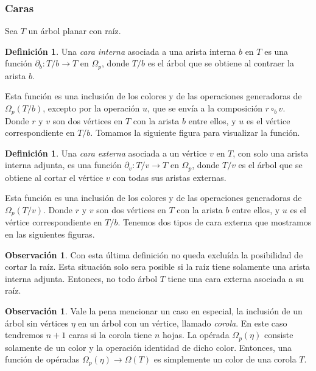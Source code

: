 \documentclass[11pt,a4paper,openright,oneside]{article}
\numberwithin{equation}{section}
\theoremstyle{definition}
\newtheorem{defi}[teo]{Definici\'on}
\newtheorem{obs}[teo]{Observaci\'on}
\begin{document}
\subsubsection{Caras}
Sea $T$ un \'arbol planar con ra\'iz.
\begin{defi}
    Una \emph{cara interna} asociada a una arista interna $b$ en $T$ es una funci\'on $\partial_b \colon T/b\to T$ en $\Omega_p$, donde $T/b$ es el \'arbol que se obtiene al contraer la arista $b$.

    Esta funci\'on es una inclusi\'on de los colores y de las operaciones generadoras de $\Omega_p(T/b)$, excepto por la operaci\'on $u$, que se env\'ia a la composici\'on $r\circ_b v$.
    Donde $r$ y $v$ son dos v\'ertices en $T$ con la arista $b$ entre ellos, y $u$ es el v\'ertice correspondiente en $T/b$. Tomamos la siguiente figura para visualizar la funci\'on.
\end{defi}
\begin{defi}
    Una \emph{cara externa} asociada a un v\'ertice $v$ en $T$, con solo una arista interna adjunta, es una funci\'on $\partial_v \colon T/v\to T$ en $\Omega_p$, donde $T/v$ es el \'arbol que se obtiene al cortar el v\'ertice $v$ con todas sus aristas externas.

    Esta funci\'on es una inclusi\'on de los colores y de las operaciones generadoras de $\Omega_p(T/v)$.
    Donde $r$ y $v$ son dos v\'ertices en $T$ con la arista $b$ entre ellos, y $u$ es el v\'ertice correspondiente en $T/b$. Tenemos dos tipos de cara externa que mostramos en las siguientes figuras.
\end{defi}
\begin{obs}
    Con esta \'ultima definici\'on no queda exclu\'ida la posibilidad de cortar la ra\'iz. Esta situaci\'on solo sera posible si la ra\'iz tiene solamente una arista interna adjunta. Entonces, no todo \'arbol $T$ tiene una cara externa asociada a su ra\'iz.
\end{obs}
\begin{obs}
    Vale la pena mencionar un caso en especial, la inclusi\'on de un \'arbol sin v\'ertices $\eta$ en un \'arbol con un v\'ertice, llamado \emph{corola}. En este caso tendremos $n+1$ caras si la corola tiene $n$ hojas.
    La op\'erada $\Omega_p(\eta)$ consiste solamente de un color y la operaci\'on identidad de dicho color. Entonces, una funci\'on de op\'eradas $\Omega_p(\eta)\to\Omega(T)$ es simplemente un color de una corola $T$.
\end{obs}
\end{document}
